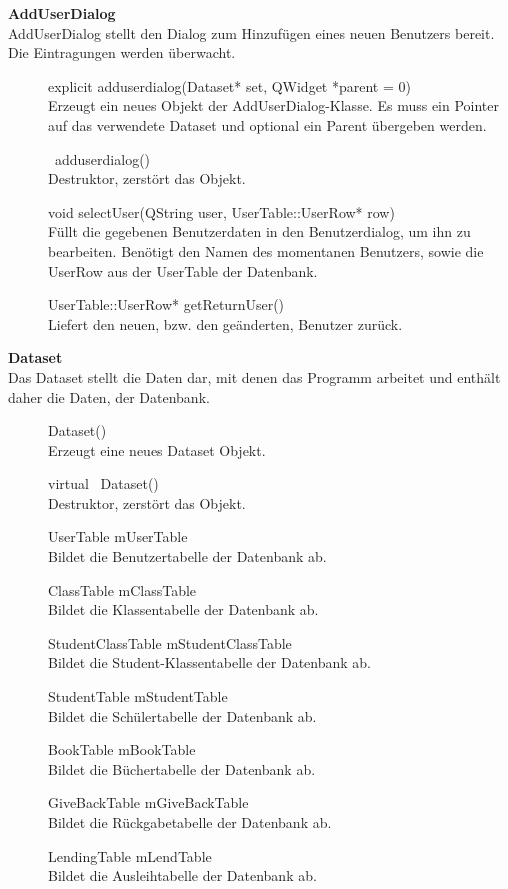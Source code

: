 \textbf{AddUserDialog}\\
AddUserDialog stellt den Dialog zum Hinzufügen eines neuen Benutzers bereit. Die Eintragungen werden überwacht. 
\begin{description}
	\item[] explicit adduserdialog(Dataset* set, QWidget *parent = 0)\\
	Erzeugt ein neues Objekt der AddUserDialog-Klasse. Es muss ein Pointer auf das verwendete Dataset und optional ein Parent übergeben werden.
	\item[] ~adduserdialog()\\
	Destruktor, zerstört das Objekt.
  	\item[] void selectUser(QString user, UserTable::UserRow* row)\\
	Füllt die gegebenen Benutzerdaten in den Benutzerdialog, um ihn zu bearbeiten. Benötigt den Namen des momentanen Benutzers, sowie die UserRow aus der UserTable der Datenbank.
  	\item[] UserTable::UserRow* getReturnUser()\\
	Liefert den neuen, bzw. den geänderten, Benutzer zurück.
\end{description}

\textbf{Dataset}\\
Das Dataset stellt die Daten dar, mit denen das Programm arbeitet und enthält daher die Daten, der Datenbank.
\begin{description}
	\item[] Dataset() \\
	Erzeugt eine neues Dataset Objekt.
	\item[] virtual ~Dataset() \\
	Destruktor, zerstört das Objekt.
  	\item[] UserTable mUserTable \\
  	Bildet die Benutzertabelle der Datenbank ab.
  	\item[] ClassTable mClassTable \\
  	Bildet die Klassentabelle der Datenbank ab.
  	\item[] StudentClassTable mStudentClassTable \\
  	Bildet die Student-Klassentabelle der Datenbank ab.
  	\item[] StudentTable mStudentTable \\
  	Bildet die Schülertabelle der Datenbank ab.
  	\item[] BookTable mBookTable \\
  	Bildet die Büchertabelle der Datenbank ab.
  	\item[] GiveBackTable mGiveBackTable \\
  	Bildet die Rückgabetabelle der Datenbank ab.
  	\item[] LendingTable mLendTable \\
  	Bildet die Ausleihtabelle der Datenbank ab.
\end{description}

